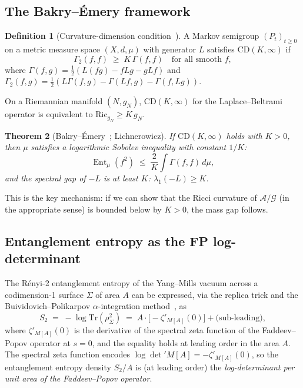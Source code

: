 \documentclass[11pt,a4paper]{amsart}
\newtheorem{theorem}{Theorem}[section]
\theoremstyle{definition}
\newtheorem{definition}[theorem]{Definition}
\theoremstyle{remark}
\newcommand{\calA}{\mathcal{A}}
\newcommand{\calG}{\mathcal{G}}
\newcommand{\Ric}{\mathrm{Ric}}
\newcommand{\Tr}{\mathrm{Tr}}
\DeclareMathOperator{\Ent}{Ent}
\begin{document}
\subsection{The Bakry--\'Emery framework}\label{ssec:bakry}

\begin{definition}[Curvature-dimension condition~\cite{BakryEmery1985}]
A Markov semigroup $(P_t)_{t \geq 0}$ on a metric measure space $(X, d, \mu)$
with generator $L$ satisfies $\mathrm{CD}(K, \infty)$ if
\[
\Gamma_2(f, f) \;\geq\; K\,\Gamma(f, f) \quad \text{for all smooth } f,
\]
where $\Gamma(f, g) = \frac{1}{2}(L(fg) - fLg - gLf)$ and
$\Gamma_2(f, g) = \frac{1}{2}(L\Gamma(f,g) - \Gamma(Lf, g) - \Gamma(f, Lg))$.
\end{definition}

On a Riemannian manifold $(N, g_N)$, $\mathrm{CD}(K, \infty)$ for
the Laplace--Beltrami operator is equivalent to $\Ric_{g_N} \geq K\,g_N$.

\begin{theorem}[Bakry--\'Emery~\cite{BakryEmery1985}; Lichnerowicz]
If $\mathrm{CD}(K, \infty)$ holds with $K > 0$, then $\mu$ satisfies a
logarithmic Sobolev inequality with constant $1/K$:
\[
\Ent_\mu(f^2) \;\leq\; \frac{2}{K} \int \Gamma(f, f)\,d\mu,
\]
and the spectral gap of $-L$ is at least $K$:
$\lambda_1(-L) \geq K$.
\end{theorem}

This is the key mechanism: if we can show that the Ricci curvature of
$\calA/\calG$ (in the appropriate sense) is bounded below by $K > 0$,
the mass gap follows.

\subsection{Entanglement entropy as the FP log-determinant}\label{ssec:EE-FP}

The R\'enyi-2 entanglement entropy of the Yang--Mills vacuum across a
codimension-1 surface $\Sigma$ of area $A$ can be expressed, via the
replica trick and the Buividovich--Polikarpov $\alpha$-integration
method~\cite{BuividovichPolikarpov2008}, as
\begin{equation}\label{eq:EE-FP}
S_2 \;=\; -\log\Tr(\rho_\Sigma^2)
\;=\; A \cdot \bigl[-\zeta'_{M[A]}(0)\bigr] + \text{(sub-leading)},
\end{equation}
where $\zeta'_{M[A]}(0)$ is the derivative of the spectral zeta function of the
Faddeev--Popov operator at $s = 0$, and the equality holds at leading order
in the area $A$. The spectral zeta function encodes
$\log\det' M[A] = -\zeta'_{M[A]}(0)$,
so the entanglement entropy density $S_2/A$ is (at leading order) the
\emph{log-determinant per unit area of the Faddeev--Popov operator}.
\end{document}
